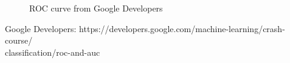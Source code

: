 \documentclass[12pt]{article}
\begin{document}
\begin{enumerate}
\begin{figure}[h]
	\centering
	\caption{ROC curve from Google Developers}
\end{figure}
Google Developers: https://developers.google.com/machine-learning/crash-course/\\
classification/roc-and-auc
\end{enumerate}
\end{document}
